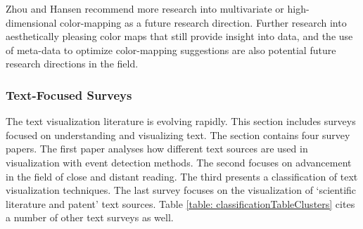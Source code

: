%
%

Zhou and Hansen recommend more research into multivariate or high-dimensional color-mapping as a future research direction. Further research into aesthetically pleasing color maps that still provide insight into data, and the use of meta-data to optimize color-mapping suggestions are also potential future research directions in the field.


\subsubsection{Text-Focused Surveys}
The text visualization literature is evolving rapidly. This section includes surveys focused on understanding and visualizing text. The section contains four survey papers. The first paper analyses how different text sources are used in visualization with event detection methods. The second focuses on advancement in the field of close and distant reading. The third presents a classification of text visualization techniques. The last survey focuses on the visualization of `scientific literature and patent' text sources. Table \ref{table: classificationTableClusters} cites a number of other text surveys as well.

